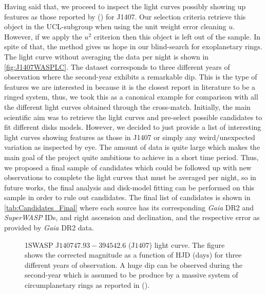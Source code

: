 Having said that, we proceed to inspect the light curves possibly showing up features as those reported by  (\citeyear{2012AJ....143...72M}) for J1407. Our selection criteria retrieve this object in the UCL-subgroup when using the unit weight error cleaning $u$. However, if we apply the $u^2$ criterion then this object is left out of the sample. In spite of that, the method gives us hope in our blind-search for exoplanetary rings. The light curve without averaging the data per night is shown in \autoref{fig:J1407WASPLC}. The dataset corresponds to three different years of observation where the second-year exhibits a remarkable dip. This is the type of features we are interested in because it is the closest report in literature to be a ringed system, thus, we took this as a canonical example for comparison with all the different light curves obtained through the cross-match. Initially, the main scientific aim was to retrieve the light curves and pre-select possible candidates to fit different disks models. However, we decided to just provide a list of interesting light curves showing features as those in J1407 or simply any weird/unexpected variation as inspected by eye. The amount of data is quite large which makes the main goal of the project quite ambitious to achieve in a short time period. Thus, we proposed a final sample of candidates which could be followed up with new observations to complete the light curves that must be averaged per night, so in future works, the final analysis and disk-model fitting can be performed on this sample in order to rule out candidates. The final list of candidates is shown in \autoref{tab:Candidates_Final} where each source has its corresponding \textit{Gaia} DR2 and \textit{SuperWASP} IDs, and right ascension and declination, and the respective error as provided by \textit{Gaia} DR2 data.\\

\begin{figure}[!ht]
\centering
\caption{\scriptsize{1SWASP J$140747.93-394542.6$ (J$1407$) light curve. The figure shows the corrected magnitude as a function of HJD (days) for three different years of observation. A huge dip can be observed during the second-year which is assumed to be produce by a massive system of circumplanetary rings as reported in  (\citeyear{2012AJ....143...72M}).}}
\label{fig:J1407WASPLC}
\end{figure}

